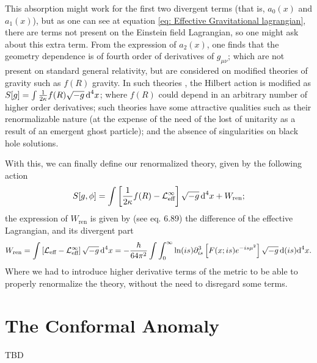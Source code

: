 This absorption might work for the first two divergent terms (that is, $a_0(x)$ and $a_1(x)$), but as one can see at equation \ref{eq: Effective Gravitational lagrangian}, there are terms not present on the Einstein field Lagrangian, so one might ask about this extra term. From the expression of $a_2(x)$, one finds that the geometry dependence is of fourth order of derivatives of $g_{\mu\nu}$; which are not present on standard general relativity, but are considered on modified theories of gravity such as $f(R)$ gravity. In such theories \cite{TFG_Miguel}, the Hilbert action is modified as $S[g]=\int\frac{1}{2\kappa}f(R)\sqrt{-g}\,\text{d}^4x$; where $f(R)$ could depend in an arbitrary number of higher order derivatives; such theories have some attractive qualities such as their renormalizable nature (at the expense of the need of the lost of unitarity as a result of an emergent ghost particle); and the absence of singularities on black hole solutions.

With this, we can finally define our renormalized theory, given by the following action
\begin{equation}
	S[g,\phi]=\int\left[\frac{1}{2\kappa}f(R)-\mathcal{L}_{\text{eff}}^\infty\right]\sqrt{-g}\,\text{d}^4x+ W_{\text{ren}};
\end{equation}
the expression of $W_{\text{ren}}$ is given by (see \cite{BirrelDavies} eq. 6.89) the difference of the effective Lagrangian, and its divergent part
\begin{equation}
	W_{\text{ren}}=\int\left[\mathcal{L}_{\text{eff}}-\mathcal{L}_{\text{eff}}^{\infty}\right]\sqrt{-g}\,\text{d}^4 x=-\frac{\hbar}{64\pi^2}\int\int_{0}^\infty\ln(is)\partial_{is}^3\left[F(x;is)e^{-is\mu^2}\right]\sqrt{-g}\,\text{d}(is)\text{d}^4x.
\end{equation}
Where we had to introduce higher derivative terms of the metric to be able to properly renormalize the theory, without the need to disregard some terms. 
\section{The Conformal Anomaly}
TBD